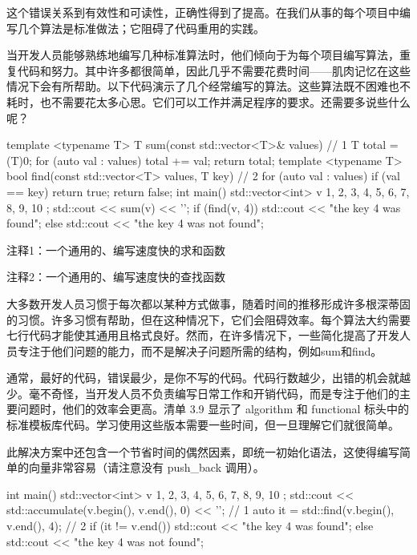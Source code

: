 这个错误关系到有效性和可读性，正确性得到了提高。在我们从事的每个项目中编写几个算法是标准做法；它阻碍了代码重用的实践。


当开发人员能够熟练地编写几种标准算法时，他们倾向于为每个项目编写算法，重复代码和努力。其中许多都很简单，因此几乎不需要花费时间——肌肉记忆在这些情况下会有所帮助。以下代码演示了几个经常编写的算法。这些算法既不困难也不耗时，也不需要花太多心思。它们可以工作并满足程序的要求。还需要多说些什么呢？


\begin{cpp}
template <typename T>
T sum(const std::vector<T>& values) { // 1
  T total = (T)0;
  for (auto val : values)
  total += val;
  return total;
}
template <typename T>
bool find(const std::vector<T> values, T key) { // 2
  for (auto val : values)
    if (val == key)
      return true;
  return false;
}
int main() {
  std::vector<int> v { 1, 2, 3, 4, 5, 6, 7, 8, 9, 10 };
  std::cout << sum(v) << '\n';
  if (find(v, 4))
    std::cout << "the key 4 was found\n";
  else
    std::cout << "the key 4 was not found\n";
}
\end{cpp}

{\footnotesize
注释1：一个通用的、编写速度快的求和函数

注释2：一个通用的、编写速度快的查找函数
}


大多数开发人员习惯于每次都以某种方式做事，随着时间的推移形成许多根深蒂固的习惯。许多习惯有帮助，但在这种情况下，它们会阻碍效率。每个算法大约需要七行代码才能使其通用且格式良好。然而，在许多情况下，一些简化提高了开发人员专注于他们问题的能力，而不是解决子问题所需的结构，例如sum和find。


通常，最好的代码，错误最少，是你不写的代码。代码行数越少，出错的机会就越少。毫不奇怪，当开发人员不负责编写日常工作和开销代码，而是专注于他们的主要问题时，他们的效率会更高。清单 3.9 显示了 algorithm 和 functional 标头中的标准模板库代码。学习使用这些版本需要一些时间，但一旦理解它们就很简单。

此解决方案中还包含一个节省时间的偶然因素，即统一初始化语法，这使得编写简单的向量非常容易（请注意没有 push\_back 调用）。


\begin{cpp}
int main() {
  std::vector<int> v { 1, 2, 3, 4, 5, 6, 7, 8, 9, 10 };
  std::cout << std::accumulate(v.begin(), v.end(), 0) << '\n'; // 1
  auto it = std::find(v.begin(), v.end(), 4); // 2
  if (it != v.end())
    std::cout << "the key 4 was found\n";
  else
    std::cout << "the key 4 was not found\n";
}
\end{cpp}

